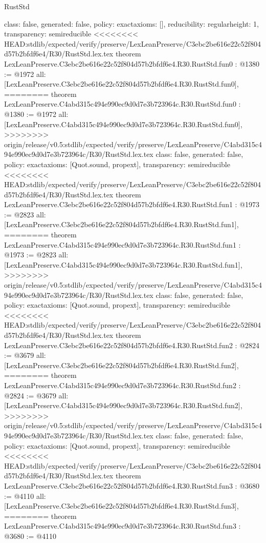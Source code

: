 \begin{lexlean}{RustStd}
\begin{coremodule}
{\begin{coremodule}
{{{  class: false,
  generated: false,
  policy: exact{axioms: []},
  reducibility: regular{height: 1},
  transparency: semireducible
}
<<<<<<<< HEAD:stdlib/expected/verify/preserve/LexLeanPreserve/C3ebc2be616e22c52f804d57b2bfdf6e4/R30/RustStd.lex.tex
theorem LexLeanPreserve.C3ebc2be616e22c52f804d57b2bfdf6e4.R30.RustStd.fun0 : @1380 := @1972 {
  all: [LexLeanPreserve.C3ebc2be616e22c52f804d57b2bfdf6e4.R30.RustStd.fun0],
========
theorem LexLeanPreserve.C4abd315c494e990ec9d0d7e3b723964c.R30.RustStd.fun0 : @1380 := @1972 {
  all: [LexLeanPreserve.C4abd315c494e990ec9d0d7e3b723964c.R30.RustStd.fun0],
>>>>>>>> origin/release/v0.5:stdlib/expected/verify/preserve/LexLeanPreserve/C4abd315c494e990ec9d0d7e3b723964c/R30/RustStd.lex.tex
  class: false,
  generated: false,
  policy: exact{axioms: [Quot.sound, propext]},
  transparency: semireducible
}
<<<<<<<< HEAD:stdlib/expected/verify/preserve/LexLeanPreserve/C3ebc2be616e22c52f804d57b2bfdf6e4/R30/RustStd.lex.tex
theorem LexLeanPreserve.C3ebc2be616e22c52f804d57b2bfdf6e4.R30.RustStd.fun1 : @1973 := @2823 {
  all: [LexLeanPreserve.C3ebc2be616e22c52f804d57b2bfdf6e4.R30.RustStd.fun1],
========
theorem LexLeanPreserve.C4abd315c494e990ec9d0d7e3b723964c.R30.RustStd.fun1 : @1973 := @2823 {
  all: [LexLeanPreserve.C4abd315c494e990ec9d0d7e3b723964c.R30.RustStd.fun1],
>>>>>>>> origin/release/v0.5:stdlib/expected/verify/preserve/LexLeanPreserve/C4abd315c494e990ec9d0d7e3b723964c/R30/RustStd.lex.tex
  class: false,
  generated: false,
  policy: exact{axioms: [Quot.sound, propext]},
  transparency: semireducible
}
<<<<<<<< HEAD:stdlib/expected/verify/preserve/LexLeanPreserve/C3ebc2be616e22c52f804d57b2bfdf6e4/R30/RustStd.lex.tex
theorem LexLeanPreserve.C3ebc2be616e22c52f804d57b2bfdf6e4.R30.RustStd.fun2 : @2824 := @3679 {
  all: [LexLeanPreserve.C3ebc2be616e22c52f804d57b2bfdf6e4.R30.RustStd.fun2],
========
theorem LexLeanPreserve.C4abd315c494e990ec9d0d7e3b723964c.R30.RustStd.fun2 : @2824 := @3679 {
  all: [LexLeanPreserve.C4abd315c494e990ec9d0d7e3b723964c.R30.RustStd.fun2],
>>>>>>>> origin/release/v0.5:stdlib/expected/verify/preserve/LexLeanPreserve/C4abd315c494e990ec9d0d7e3b723964c/R30/RustStd.lex.tex
  class: false,
  generated: false,
  policy: exact{axioms: [Quot.sound, propext]},
  transparency: semireducible
}
<<<<<<<< HEAD:stdlib/expected/verify/preserve/LexLeanPreserve/C3ebc2be616e22c52f804d57b2bfdf6e4/R30/RustStd.lex.tex
theorem LexLeanPreserve.C3ebc2be616e22c52f804d57b2bfdf6e4.R30.RustStd.fun3 : @3680 := @4110 {
  all: [LexLeanPreserve.C3ebc2be616e22c52f804d57b2bfdf6e4.R30.RustStd.fun3],
========
theorem LexLeanPreserve.C4abd315c494e990ec9d0d7e3b723964c.R30.RustStd.fun3 : @3680 := @4110 {
}}}}}}}
\end{coremodule}}
\end{coremodule}
\end{lexlean}

